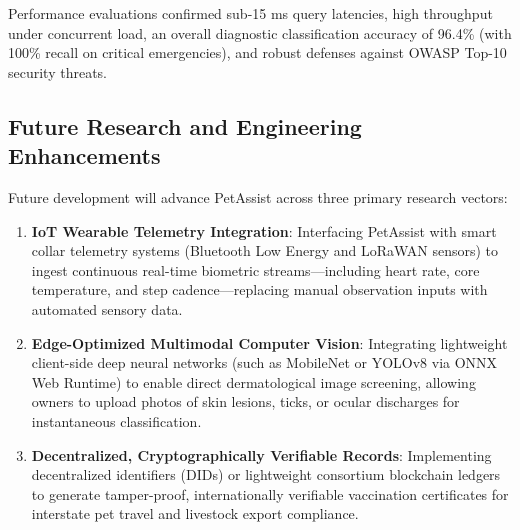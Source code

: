 \documentclass[conference]{IEEEtran}
\begin{document}
Performance evaluations confirmed sub-15 ms query latencies, high throughput under concurrent load, an overall diagnostic classification accuracy of 96.4\% (with 100\% recall on critical emergencies), and robust defenses against OWASP Top-10 security threats.

\subsection{Future Research and Engineering Enhancements}
Future development will advance PetAssist across three primary research vectors:
\begin{enumerate}
    \item \textbf{IoT Wearable Telemetry Integration}: Interfacing PetAssist with smart collar telemetry systems (Bluetooth Low Energy and LoRaWAN sensors) to ingest continuous real-time biometric streams---including heart rate, core temperature, and step cadence---replacing manual observation inputs with automated sensory data.
    \item \textbf{Edge-Optimized Multimodal Computer Vision}: Integrating lightweight client-side deep neural networks (such as MobileNet or YOLOv8 via ONNX Web Runtime) to enable direct dermatological image screening, allowing owners to upload photos of skin lesions, ticks, or ocular discharges for instantaneous classification.
    \item \textbf{Decentralized, Cryptographically Verifiable Records}: Implementing decentralized identifiers (DIDs) or lightweight consortium blockchain ledgers to generate tamper-proof, internationally verifiable vaccination certificates for interstate pet travel and livestock export compliance.
\end{enumerate}
\end{document}

